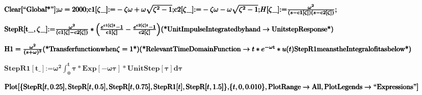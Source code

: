 \documentclass{article}
\begin{document}
\begin{doublespace}
\noindent\(\pmb{\text{Clear}[\text{{``}Global$\grave{ }$*{''}}];}\\
\pmb{\omega =2000 ;}\\
\pmb{\text{c1}[\zeta \_]\text{:=}-\zeta  \omega  + \omega  \sqrt{\zeta ^2-1};}\\
\pmb{\text{c2}[\zeta \_]\text{:=}-\zeta  \omega  - \omega \sqrt{\zeta ^2-1};}\\
\pmb{H[\zeta \_]\text{:=}\frac{\omega ^2}{(s-\text{c1}[\zeta ])(s-\text{c2}[\zeta ])};}\)
\end{doublespace}

\begin{doublespace}
\noindent\(\pmb{\text{StepR}[\text{t$\_$},\zeta \_]\text{:=}\frac{\omega ^2}{(\text{c1}[\zeta ]-\text{c2}[\zeta ])}*\left(\frac{e^{\text{c1}[\zeta
]t}-1}{\text{c1}[\zeta ]}-\frac{e^{\text{c2}[\zeta ]t}-1}{\text{c2}[\zeta ]}\right) }\\
\pmb{\text{(*} \text{Unit} \text{Impulse} \text{Integrated} \text{by} \text{hand} \to  \text{Unit} \text{step} \text{Response} \text{*)}}\)
\end{doublespace}

\begin{doublespace}
\noindent\(\pmb{\text{H1}=\frac{\omega ^2}{(s+ \omega )^2} \text{(*} \text{Transfer} \text{function} \text{when} \zeta =1 \text{*)}}\\
\pmb{\text{(*} \text{Relevant} \text{Time} \text{Domain} \text{Function} \to  t*e^{-\text{$\omega $t}}*u(t) \text{StepR1} \text{means} \text{the}
\text{Integral} \text{of} \text{it} \text{as} \text{below} \text{*)}}\)
\end{doublespace}

\begin{doublespace}
\noindent\(\pmb{\text{StepR1}[\text{t$\_$}]\text{:=}\omega ^2\int _0^t\tau *\text{Exp}[-\omega  \tau ]*\text{UnitStep}[\tau ]d\tau  }\)
\end{doublespace}

\begin{doublespace}
\noindent\(\pmb{\text{Plot}[\{\text{StepR}[t,0.25],\text{StepR}[t,0.5],\text{StepR}[t,0.75],\text{StepR1}[t],\text{StepR}[t,1.5]\},}\\
\pmb{\{t,0,0.010\},\text{PlotRange}\to \text{All},\text{PlotLegends}\to \text{{``}Expressions{''}}]}\)
\end{doublespace}

\begin{doublespace}
\noindent\(\begin{array}{cc}
  &  \\
\end{array}\)
\end{doublespace}
\end{document}
